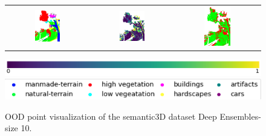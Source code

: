 \begin{figure}[h!]
\begin{tabular}{ccc}
                \includegraphics[width=0.33\textwidth, height=0.18\textheight]{images/ood_imgs/fout_sem3d/fout_3.png} &
                \includegraphics[width=0.33\textwidth, height=0.18\textheight]{images/ood_imgs/fout_sem3d/fout_ent_3.png}& 
                \includegraphics[width=0.33\textwidth, height=0.18\textheight]{images/ood_imgs/fout_sem3d/fout_ent_ood_auroc_3.png}\\
            \end{tabular}
            \includegraphics[scale=0.45]{images/prob_legend.pdf}
            \includegraphics[scale=0.65]{images/legend.png}
            \caption{OOD point visualization of the semantic3D dataset Deep Ensembles-size 10.}
            \label{fig:fout_ood_auroc_sem3d_ent}
        \end{figure}
